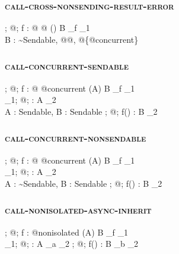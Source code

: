 \subsubsection{\textsc{call-cross-nonsending-result-error}}

  {\Gamma;\; @\kappa;\;  \vdash f : @\sigma\; @\iota\; ()\; \alpha \to B \at \rho_f \dashv \Gamma_1 \\
   B : {\sim}\textsf{Sendable},\; @\kappa \neq @\iota,\; @\iota \notin \{@\textsf{concurrent}\}}
  {}

\subsubsection{\textsc{call-concurrent-sendable}}

  {\Gamma;\; @\kappa;\;  \vdash f : @\sigma\; @\textsf{concurrent}\; (A)\;  \to B \at \rho_f \dashv \Gamma_1 \\
   \Gamma_1;\; @\kappa;\;  \vdash {} : A \at \mathunderscore \dashv \Gamma_2 \\
   A : \textsf{Sendable},\; B : \textsf{Sendable}}
  {\Gamma;\; @\kappa;\;  \vdash {}\; f() : B \at \mathunderscore \dashv \Gamma_2}

\subsubsection{\textsc{call-concurrent-nonsendable}}

  {\Gamma;\; @\kappa;\;  \vdash f : @\sigma\; @\textsf{concurrent}\; (A)\;  \to B \at \rho_f \dashv \Gamma_1 \\
   \Gamma_1;\; @\kappa;\;  \vdash {} : A \at \disconnected \dashv \Gamma_2 \\
   A : {\sim}\textsf{Sendable},\; B : \textsf{Sendable}}
  {\Gamma;\; @\kappa;\;  \vdash {}\; f() : B \at \mathunderscore \dashv \Gamma_2}

\subsubsection{\textsc{call-nonisolated-async-inherit}}

  {\Gamma;\; @\kappa;\;  \vdash f : @\textsf{nonisolated}\; (A)\;  \to B \at \rho_f \dashv \Gamma_1 \\
   \Gamma_1;\; @\kappa;\;  \vdash {} : A \at \rho_a \dashv \Gamma_2}
  {\Gamma;\; @\kappa;\;  \vdash {}\; f() : B \at \rho_b \dashv \Gamma_2}

